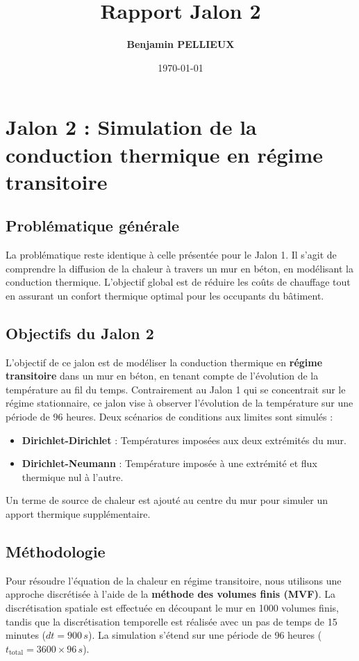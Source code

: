 \documentclass[a4paper,11pt]{article}
\title{Rapport Jalon 2}
\author{\textbf{Benjamin PELLIEUX}}
\date{\today}
\begin{document}
\maketitle
\section{Jalon 2 : Simulation de la conduction thermique en régime transitoire}

\subsection{Problématique générale}
La problématique reste identique à celle présentée pour le Jalon 1. Il s'agit de comprendre la diffusion de la chaleur à travers un mur en béton, en modélisant la conduction thermique. L'objectif global est de réduire les coûts de chauffage tout en assurant un confort thermique optimal pour les occupants du bâtiment.

\subsection{Objectifs du Jalon 2}
L'objectif de ce jalon est de modéliser la conduction thermique en \textbf{régime transitoire} dans un mur en béton, en tenant compte de l'évolution de la température au fil du temps. Contrairement au Jalon 1 qui se concentrait sur le régime stationnaire, ce jalon vise à observer l'évolution de la température sur une période de 96 heures. Deux scénarios de conditions aux limites sont simulés :
\begin{itemize}
    \item \textbf{Dirichlet-Dirichlet} : Températures imposées aux deux extrémités du mur.
    \item \textbf{Dirichlet-Neumann} : Température imposée à une extrémité et flux thermique nul à l'autre.
\end{itemize}
Un terme de source de chaleur est ajouté au centre du mur pour simuler un apport thermique supplémentaire.

\subsection{Méthodologie}
Pour résoudre l'équation de la chaleur en régime transitoire, nous utilisons une approche discrétisée à l'aide de la \textbf{méthode des volumes finis (MVF)}. La discrétisation spatiale est effectuée en découpant le mur en 1000 volumes finis, tandis que la discrétisation temporelle est réalisée avec un pas de temps de 15 minutes (\(dt = 900 \, s\)). La simulation s'étend sur une période de 96 heures (\(t_{\text{total}} = 3600 \times 96 \, s\)).
\end{document}
